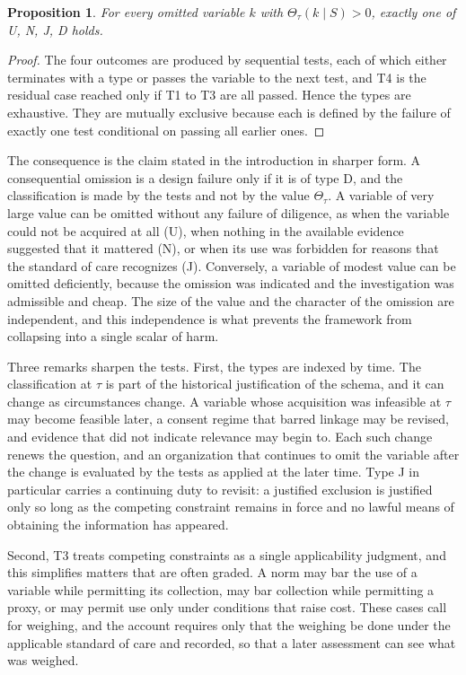 \documentclass[11pt]{article}
\newcommand{\Th}{\Theta}
\theoremstyle{plain}
\newtheorem{proposition}{Proposition}
\theoremstyle{definition}
\begin{document}
\begin{proposition}\label{prop:types}
For every omitted variable $k$ with $\Th_\tau(k\mid S)>0$, exactly one of U, N, J, D holds.
\end{proposition}

\begin{proof}
The four outcomes are produced by sequential tests, each of which either terminates with a type or passes the variable to the next test, and T4 is the residual case reached only if T1 to T3 are all passed. Hence the types are exhaustive. They are mutually exclusive because each is defined by the failure of exactly one test conditional on passing all earlier ones.
\end{proof}

The consequence is the claim stated in the introduction in sharper form. A consequential omission is a design failure only if it is of type D, and the classification is made by the tests and not by the value $\Th_\tau$. A variable of very large value can be omitted without any failure of diligence, as when the variable could not be acquired at all (U), when nothing in the available evidence suggested that it mattered (N), or when its use was forbidden for reasons that the standard of care recognizes (J). Conversely, a variable of modest value can be omitted deficiently, because the omission was indicated and the investigation was admissible and cheap. The size of the value and the character of the omission are independent, and this independence is what prevents the framework from collapsing into a single scalar of harm.

Three remarks sharpen the tests. First, the types are indexed by time. The classification at $\tau$ is part of the historical justification of the schema, and it can change as circumstances change. A variable whose acquisition was infeasible at $\tau$ may become feasible later, a consent regime that barred linkage may be revised, and evidence that did not indicate relevance may begin to. Each such change renews the question, and an organization that continues to omit the variable after the change is evaluated by the tests as applied at the later time. Type J in particular carries a continuing duty to revisit: a justified exclusion is justified only so long as the competing constraint remains in force and no lawful means of obtaining the information has appeared.

Second, T3 treats competing constraints as a single applicability judgment, and this simplifies matters that are often graded. A norm may bar the use of a variable while permitting its collection, may bar collection while permitting a proxy, or may permit use only under conditions that raise cost. These cases call for weighing, and the account requires only that the weighing be done under the applicable standard of care and recorded, so that a later assessment can see what was weighed.
\end{document}
